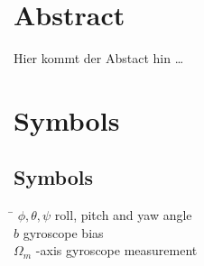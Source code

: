 




 \setcounter{tocdepth}{2}
 \tableofcontents

 \cleardoublepage







\chapter*{Abstract}

Hier kommt der Abstact hin \dots

 \cleardoublepage


\chapter*{Symbols}\label{chap:symbole}

\section*{Symbols}
\begin{tabbing}
 \hspace*{3cm} \= \kill
  $\phi, \theta, \psi$ 					\> roll, pitch and yaw angle \\[0.5ex] 					
  $b$														\> gyroscope bias \\[0.5ex]										
  $\Omega_m$										-axis gyroscope measurement \\[0.5ex]   		
 \end{tabbing}

